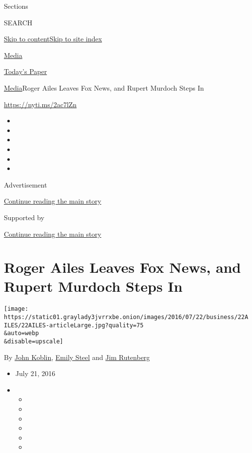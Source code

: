 Sections

SEARCH

\protect\hyperlink{site-content}{Skip to
content}\protect\hyperlink{site-index}{Skip to site index}

\href{https://www.nytimes3xbfgragh.onion/section/business/media}{Media}

\href{https://myaccount.nytimes3xbfgragh.onion/auth/login?response_type=cookie\&client_id=vi}{}

\href{https://www.nytimes3xbfgragh.onion/section/todayspaper}{Today's
Paper}

\href{/section/business/media}{Media}\textbar{}Roger Ailes Leaves Fox
News, and Rupert Murdoch Steps In

\url{https://nyti.ms/2ac7lZn}

\begin{itemize}
\item
\item
\item
\item
\item
\item
\end{itemize}

Advertisement

\protect\hyperlink{after-top}{Continue reading the main story}

Supported by

\protect\hyperlink{after-sponsor}{Continue reading the main story}

\hypertarget{roger-ailes-leaves-fox-news-and-rupert-murdoch-steps-in}{%
\section{Roger Ailes Leaves Fox News, and Rupert Murdoch Steps
In}\label{roger-ailes-leaves-fox-news-and-rupert-murdoch-steps-in}}

\texttt{[image: https://static01.graylady3jvrrxbe.onion/images/2016/07/22/business/22AILES/22AILES-articleLarge.jpg?quality=75\\\&auto=webp\\\&disable=upscale]}

By \href{https://www.nytimes3xbfgragh.onion/by/john-koblin}{John
Koblin}, \href{https://www.nytimes3xbfgragh.onion/by/emily-steel}{Emily
Steel} and \href{http://www.nytimes3xbfgragh.onion/by/jim-rutenberg}{Jim
Rutenberg}

\begin{itemize}
\item
  July 21, 2016
\item
  \begin{itemize}
  \item
  \item
  \item
  \item
  \item
  \item
  \end{itemize}
\end{itemize}

